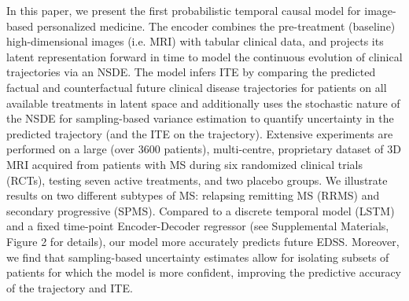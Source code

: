 \documentclass[runningheads]{llncs}
\begin{document}
In this paper, we present the first probabilistic temporal causal model for image-based personalized medicine. The encoder combines the pre-treatment (baseline) high-dimensional images (i.e. MRI) with tabular clinical data, and projects its latent representation forward in time to model the continuous evolution of clinical trajectories via an NSDE. The model infers ITE by comparing the predicted factual and counterfactual future clinical disease trajectories for patients on all available treatments in latent space and additionally uses the stochastic nature of the NSDE for sampling-based variance estimation to quantify uncertainty in the predicted trajectory (and the ITE on the trajectory). Extensive experiments are performed on a large (over 3600 patients), multi-centre, proprietary dataset of 3D MRI acquired from patients with MS during six randomized clinical trials (RCTs), testing seven active treatments, and two placebo groups. We illustrate results on two different subtypes of MS: relapsing remitting MS (RRMS) and secondary progressive (SPMS). Compared to a discrete temporal model (LSTM) and a fixed time-point Encoder-Decoder regressor (see Supplemental Materials, Figure 2 for details), our model more accurately predicts future EDSS. Moreover, we find that sampling-based uncertainty estimates allow for isolating subsets of patients for which the model is more confident, improving the predictive accuracy of the trajectory and ITE.





\end{document}
